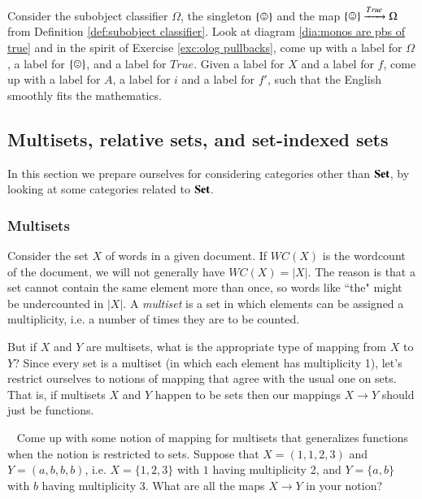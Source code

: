 \begin{exercise}
Consider the subobject classifier $\Omega$, the singleton $\singleton$ and the map $\singleton\To{True}\Omega$ from Definition \ref{def:subobject classifier}. Look at diagram \ref{dia:monos are pbs of true} and in the spirit of Exercise \ref{exc:olog pullbacks}, come up with a label for $\Omega$, a label for $\singleton$, and a label for $True$. Given a label for $X$ and a label for $f$, come up with a label for $A$, a label for $i$ and a label for $f'$, such that the English smoothly fits the mathematics.
\end{exercise}


\subsection{Multisets, relative sets, and set-indexed sets}

In this section we prepare ourselves for considering categories other than ${\bf Set}$, by looking at some categories related to ${\bf Set}$. 


\subsubsection{Multisets}

Consider the set $X$ of words in a given document. If $WC(X)$ is the wordcount of the document, we will not generally have $WC(X)=|X|$. The reason is that a set cannot contain the same element more than once, so words like ``the" might be undercounted in $|X|$. A {\em multiset} is a set in which elements can be assigned a multiplicity, i.e. a number of times they are to be counted. 

But if $X$ and $Y$ are multisets, what is the appropriate type of mapping from $X$ to $Y$? Since every set is a multiset (in which each element has multiplicity 1), let's restrict ourselves to notions of mapping that agree with the usual one on sets. That is, if multisets $X$ and $Y$ happen to be sets then our mappings $X\to Y$ should just be functions.

\begin{exercise}\label{exc:multiset 1}~
\sexc Come up with some notion of mapping for multisets that generalizes functions when the notion is restricted to sets. 
\next Suppose that $X=(1,1,2,3)$ and $Y=(a,b,b,b)$, i.e. $X=\{1,2,3\}$ with $1$ having multiplicity 2, and $Y=\{a,b\}$ with $b$ having multiplicity 3. What are all the maps $X\to Y$ in your notion?
\endsexc
\end{exercise}

